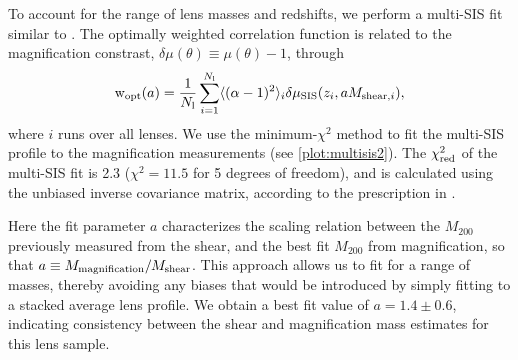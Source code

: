 To account for the range of lens masses and redshifts, we perform a multi-\ac{SIS} fit similar to \citet{Hildebrandt11}.  The optimally weighted correlation function is related to the magnification constrast, $\delta\mu(\theta) \equiv \mu(\theta) -1$, through
\begin{equation}
\mathrm{w}_{\rm opt}(a)= \frac{1}{N_{\rm l}}\sum_{i=1}^{N_{\rm l}} \langle (\alpha -1)^2 \rangle_i \delta \mu_{\rm SIS} (z_i, aM_{{\rm shear},i}),
\end{equation}
where $i$ runs over all lenses. We use the minimum-$\chi^2$ method to fit the multi-\ac{SIS} profile to the magnification measurements (see \autoref{plot:multisis2}). The $\chi^2_{\rm red}$ of the multi-\ac{SIS} fit is 2.3 ($\chi^2=11.5$ for 5 degrees of freedom), and is calculated using the unbiased inverse covariance matrix, according to the prescription in \citet{Hartlap07}.

Here the fit parameter $a$ characterizes the scaling relation between the $M_{200}$ previously measured from the shear, and the best fit $M_{200}$ from magnification, so that $a \equiv M_{\rm magnification}/M_{\rm shear}$. This approach allows us to fit for a range of masses, thereby avoiding any biases that would be introduced by simply fitting to a stacked average lens profile.  We obtain a best fit value of $a=1.4 \pm 0.6$, indicating consistency between the shear and magnification mass estimates for this lens sample.


